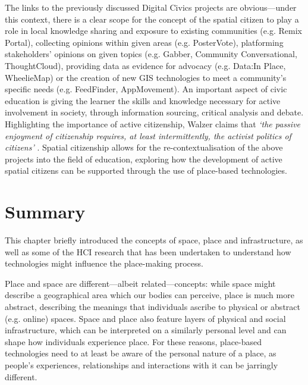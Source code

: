 The links to the previously discussed Digital Civics projects are obvious---under this context, there is a clear scope for the concept of the spatial citizen to play a role in local knowledge sharing and exposure to existing communities (e.g. Remix Portal), collecting opinions within given areas (e.g. PosterVote), platforming stakeholders' opinions on given topics (e.g. Gabber, Community Conversational, ThoughtCloud), providing data as evidence for advocacy (e.g. Data:In Place, WheelieMap) or the creation of new GIS technologies to meet a community's specific needs (e.g. FeedFinder, AppMovement). An important aspect of civic education is giving the learner the skills and knowledge necessary for active involvement in society, through information sourcing, critical analysis and debate. Highlighting the importance of active citizenship, Walzer claims that \textit{`the passive enjoyment of citizenship requires, at least intermittently, the activist politics of citizens’} \citep{Walzer1983}. Spatial citizenship allows for the re-contextualisation of the above projects into the field of education, exploring how the development of active spatial citizens can be supported through the use of place-based technologies. 

\section{Summary}

This chapter briefly introduced the concepts of space, place and infrastructure, as well as some of the HCI research that has been undertaken to understand how technologies might influence the place-making process.

Place and space are different---albeit related---concepts: while space might describe a geographical area which our bodies can perceive, place is much more abstract, describing the meanings that individuals ascribe to physical or abstract (e.g. online) spaces. Space and place also feature layers of physical and social infrastructure, which can be interpreted on a similarly personal level and can shape how individuals experience place. For these reasons, place-based technologies need to at least be aware of the personal nature of a place, as people's experiences, relationships and interactions with it can be jarringly different.

